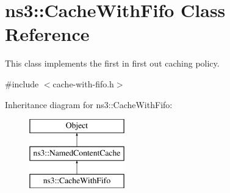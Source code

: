 \hypertarget{classns3_1_1CacheWithFifo}{\section{ns3\-:\-:Cache\-With\-Fifo Class Reference}
\label{classns3_1_1CacheWithFifo}
}


This class implements the first in first out caching policy.  




{\ttfamily \#include $<$cache-\/with-\/fifo.\-h$>$}

Inheritance diagram for ns3\-:\-:Cache\-With\-Fifo\-:\begin{figure}[H]
\begin{center}
\leavevmode
\includegraphics[height=3.000000cm]{classns3_1_1CacheWithFifo}
\end{center}
\end{figure}
